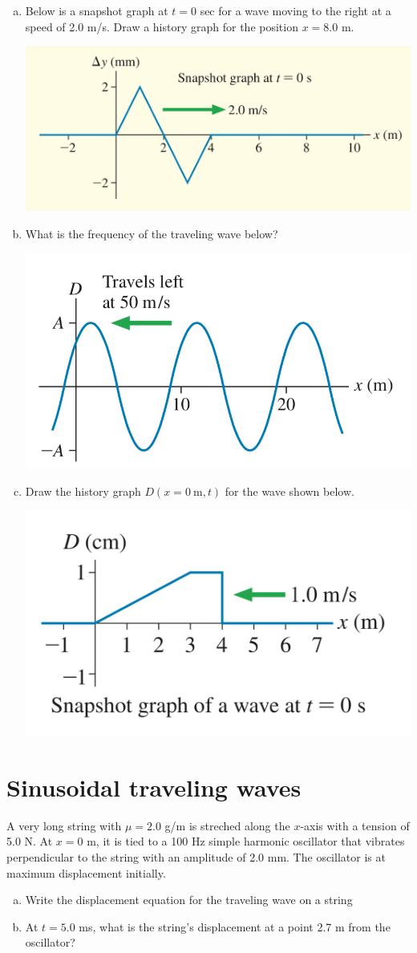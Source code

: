 \documentclass[11pt]{article}
\begin{document}
\begin{enumerate}[(a)]

\item Below is a snapshot graph at $t = 0$ sec for a wave moving to the right at a speed of 2.0 m/s. Draw a history graph for the position $x = 8.0$ m.
\begin{center}
\includegraphics[width=.5\linewidth]{PSet4_FigA}
\end{center}

\item What is the frequency of the traveling wave below?
\begin{center}
\includegraphics[width=.5\linewidth]{PSet4_FigB}
\end{center}


\item Draw the history graph $D(x = 0 \ \text{m},t)$ for the wave shown below.
\begin{center}
\includegraphics[width=.5\linewidth]{PSet4_FigC}
\end{center}

\end{enumerate}


\section{Sinusoidal traveling waves}
A very long string with $\mu = 2.0$ g/m is streched along the $x$-axis with a tension of 5.0 N. At $x=0$ m, it is tied to a 100 Hz simple harmonic oscillator that vibrates perpendicular to the string with an amplitude of 2.0 mm. The oscillator is at maximum displacement initially.

\begin{enumerate}[(a)]
	\item Write the displacement equation for the traveling wave on a string

	\item At $t = 5.0$ ms, what is the string's displacement at a point 2.7 m from the oscillator?
\end{enumerate}
\end{document}
